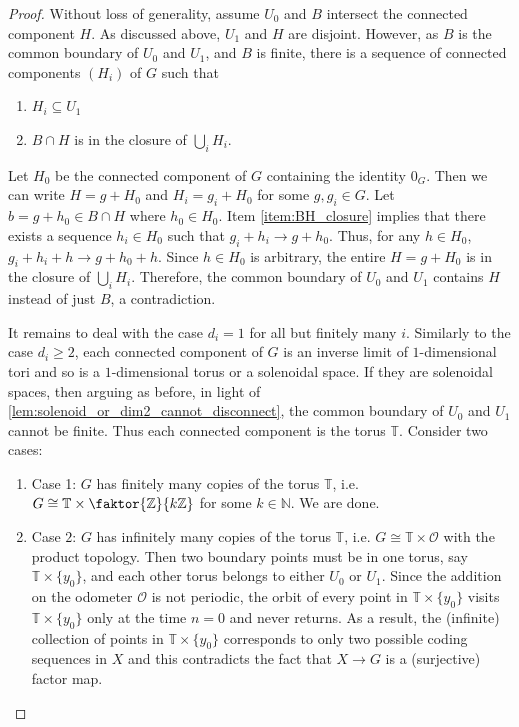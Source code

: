 \documentclass[11pt,reqno]{amsart}
\theoremstyle{definition}
\theoremstyle{plain}
\newcommand{\Z}{\mathbb{Z}}
\newcommand{\N}{\mathbb{N}}
\newcommand{\T}{\mathbb{T}}
\begin{document}
\begin{proof}
Without loss of generality, assume $U_0$ and $B$ intersect the connected component $H$. As discussed above, $U_1$ and $H$ are disjoint. However, as $B$ is the common boundary of $U_0$ and $U_1$, and $B$ is finite, there is a sequence of connected components $(H_i)$ of $G$ such that
\begin{enumerate}
    \item $H_i \subseteq U_1$
    \item \label{item:BH_closure} $B \cap H$ is in the closure of $\bigcup_i H_i$.
\end{enumerate}
Let $H_0$ be the connected component of $G$ containing the identity $0_G$. Then we can write $H = g + H_0$ and $H_i = g_i + H_0$ for some $g, g_i \in G$. Let $b = g + h_0 \in B \cap H$ where $h_0 \in H_0$. Item \eqref{item:BH_closure} implies that there exists a sequence $h_i \in H_0$ such that $g_i + h_i \to g + h_0$. Thus, for any $h \in H_0$, $g_i + h_i + h \to g + h_0 + h$. Since $h \in H_0$ is arbitrary, the entire $H = g + H_0$ is in the closure of $\bigcup_i H_i$.
Therefore, the common boundary of $U_0$ and $U_1$ contains $H$ instead of just $B$, a contradiction. 

It remains to deal with the case $d_i = 1$ for all but finitely many $i$. Similarly to the case $d_i \geq 2$, each connected component of $G$ is an inverse limit of $1$-dimensional tori and so is a $1$-dimensional torus or a solenoidal space. If they are solenoidal spaces, then arguing as before, in light of \cref{lem:solenoid_or_dim2_cannot_disconnect}, the common boundary of $U_0$ and $U_1$ cannot be finite. Thus each connected component is the torus $\T$. %
Consider two cases:
\begin{enumerate}
    \item Case 1: $G$ has finitely many copies of the torus $\T$, i.e. $G \cong \T \times \faktor{\Z}{k\Z}$ for some $k \in \N$. We are done. 
    

    \item Case $2$: $G$ has infinitely many copies of the torus $\T$, i.e. $G \cong \T \times \mathcal{O}$ with the product topology. Then two boundary points must be in one torus, say $\T \times \{y_0\}$, and each other torus belongs to either $U_0$ or $U_1$. Since the addition on the odometer $\mathcal{O}$ is not periodic, the orbit of every point in $\T \times \{y_0\}$ visits $\T \times \{y_0\}$ only at the time $n = 0$ and never returns. As a result, the (infinite) collection of points in $\T \times \{y_0\}$ corresponds to only two possible coding sequences in $X$ and this contradicts the fact that $X \to G$ is a (surjective) factor map.
    

\end{enumerate}
\end{proof}
\end{document}
